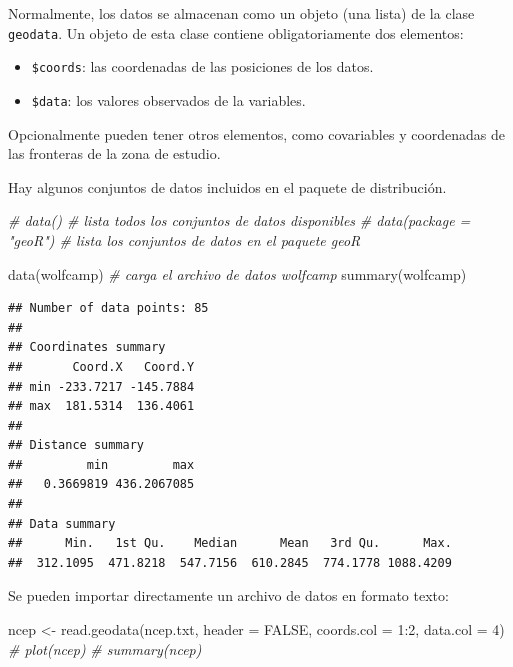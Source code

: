 \documentclass[
  spanish,
]{book}
\newenvironment{Shaded}{\begin{snugshade}}{\end{snugshade}}
\newcommand{\AttributeTok}[1]{\textcolor[rgb]{0.77,0.63,0.00}{#1}}
\newcommand{\CommentTok}[1]{\textcolor[rgb]{0.56,0.35,0.01}{\textit{#1}}}
\newcommand{\ConstantTok}[1]{\textcolor[rgb]{0.00,0.00,0.00}{#1}}
\newcommand{\DecValTok}[1]{\textcolor[rgb]{0.00,0.00,0.81}{#1}}
\newcommand{\FunctionTok}[1]{\textcolor[rgb]{0.00,0.00,0.00}{#1}}
\newcommand{\NormalTok}[1]{#1}
\newcommand{\OtherTok}[1]{\textcolor[rgb]{0.56,0.35,0.01}{#1}}
\newcommand{\SpecialCharTok}[1]{\textcolor[rgb]{0.00,0.00,0.00}{#1}}
\newcommand{\StringTok}[1]{\textcolor[rgb]{0.31,0.60,0.02}{#1}}
\theoremstyle{break}
\begin{document}
Normalmente, los datos se almacenan como un objeto (una lista) de la
clase \texttt{geodata}. Un objeto de esta clase contiene obligatoriamente dos
elementos:

\begin{itemize}
\item
  \texttt{\$coords}: las coordenadas de las posiciones de los datos.
\item
  \texttt{\$data}: los valores observados de la variables.
\end{itemize}

Opcionalmente pueden tener otros elementos, como covariables
y coordenadas de las fronteras de la zona de estudio.

Hay algunos conjuntos de datos incluidos en el paquete de distribución.

\begin{Shaded}
\begin{Highlighting}[]
\CommentTok{\# data()                    \# lista todos los conjuntos de datos disponibles}
\CommentTok{\# data(package = "geoR")    \# lista los conjuntos de datos en el paquete geoR}

\FunctionTok{data}\NormalTok{(wolfcamp)              }\CommentTok{\# carga el archivo de datos wolfcamp}
\FunctionTok{summary}\NormalTok{(wolfcamp)}
\end{Highlighting}
\end{Shaded}

\begin{verbatim}
## Number of data points: 85 
## 
## Coordinates summary
##       Coord.X   Coord.Y
## min -233.7217 -145.7884
## max  181.5314  136.4061
## 
## Distance summary
##         min         max 
##   0.3669819 436.2067085 
## 
## Data summary
##      Min.   1st Qu.    Median      Mean   3rd Qu.      Max. 
##  312.1095  471.8218  547.7156  610.2845  774.1778 1088.4209
\end{verbatim}

Se pueden importar directamente un archivo de datos en formato texto:

\begin{Shaded}
\begin{Highlighting}[]
\NormalTok{ncep }\OtherTok{\textless{}{-}} \FunctionTok{read.geodata}\NormalTok{(}\StringTok{\textquotesingle{}ncep.txt\textquotesingle{}}\NormalTok{, }\AttributeTok{header =} \ConstantTok{FALSE}\NormalTok{, }\AttributeTok{coords.col =} \DecValTok{1}\SpecialCharTok{:}\DecValTok{2}\NormalTok{, }\AttributeTok{data.col =} \DecValTok{4}\NormalTok{)}
\CommentTok{\# plot(ncep)}
\CommentTok{\# summary(ncep)}
\end{Highlighting}
\end{Shaded}
\end{document}
